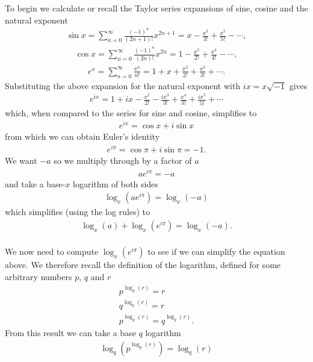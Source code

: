 \documentclass[12pt]{article}
\begin{document}
\noindent
To begin we calculate or recall the Taylor series expansions of sine, cosine and the natural exponent
\begin{align}
\sin x = \sum^{\infty}_{n=0} \frac{(-1)^n}{(2n+1)!} x^{2n+1} = x - \frac{x^3}{3!} + \frac{x^5}{5!} - \cdots,
\end{align}
\begin{align}
\cos x = \sum^{\infty}_{n=0} \frac{(-1)^n}{(2n)!} x^{2n} = 1 - \frac{x^2}{2!} + \frac{x^4}{4!} - \cdots,
\end{align}
\begin{align}
e^{x} = \sum^{\infty}_{n=0} \frac{x^n}{n!} = 1 + x + \frac{x^2}{2!} + \frac{x^3}{3!} + \cdots.
\end{align}
Substituting the above expansion for the natural exponent with $ ix = x\sqrt{-1}$ gives
\begin{align}
e^{ix} = 1 + ix - \frac{x^2}{2!} - \frac{ix^3}{3!} + \frac{x^4}{3!} + \frac{ix^5}{5!} + \cdots
\end{align}
which, when compared to the series for sine and cosine, simplifies to
\begin{align}
e^{ix} = \cos x + i\sin x
\end{align}
from which we can obtain Euler's identity
\begin{align}
\label{easybit}
e^{i\pi} = \cos \pi + i\sin \pi = -1.
\end{align}
We want $ -a $ so we multiply through by a factor of $ a $
\begin{align}
a e^{i\pi} = -a
\end{align}
and take a base-$ x $ logarithm of both sides
\begin{align}
\log_x (a e^{i\pi}) = \log_x (-a)
\end{align}
which simplifies (using the log rules) to
\begin{align}
\label{simplify}
\log_x (a) + \log_x (e^{i\pi}) = \log_x (-a).
\end{align}\\
We now need to compute $ \log_x (e^{i\pi}) $ to see if we can simplify the equation above. We therefore recall the definition of the logarithm, defined for some arbitrary numbers $ p $, $ q $ and $ r $
\begin{align}
p^{\log_p (r)} = r \\
q^{\log_q (r)} = r \\
p^{\log_p (r)} = q^{\log_q (r)}.
\end{align}
From this result we can take a base $ q $ logarithm
\begin{align}
\log_q (p^{\log_p (r)}) = \log_q (r)
\end{align}
\end{document}
